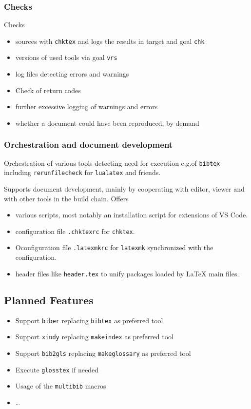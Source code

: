 \documentclass[a4paper,notumble,10pt,english]{leaflet}%
\begin{document}
\subsubsection{Checks}

Checks 
%
\begin{itemize}
  \item
  sources with \texttt{chktex} and logs the results in target and goal \texttt{chk} 
  \item
  versions of used tools via goal \texttt{vrs} 
  \item
  log files detecting errors and warnings 
  \item
  Check of return codes 
  \item
  further excessive logging of warnings and errors 
  \item
  whether a document could have been reproduced, by demand 
\end{itemize}


\subsubsection{Orchestration and document development}

Orchestration of various tools detecting need for execution 
e.g.\@ of \texttt{bibtex} including \texttt{rerunfilecheck} for \texttt{lualatex} and friends.

Supports document development, mainly by cooperating with editor, viewer and with other tools in the build chain. 
Offers 
%
\begin{itemize}
  \item various scripts, 
  most notably an installation script for extensions of VS Code.
  \item configuration file \texttt{.chktexrc} for \texttt{chktex}.
  \item Oconfiguration file \texttt{.latexmkrc} 
  for \texttt{latexmk} synchronized with the configuration.
  \item header files like \texttt{header.tex} 
  to unify packages loaded by \LaTeX{} main files. %
\end{itemize}

\subsection{Planned Features}

\begin{itemize}
  \item Support \texttt{biber} replacing \texttt{bibtex} as preferred tool
  \item Support \texttt{xindy} replacing \texttt{makeindex} as preferred tool
  \item Support \texttt{bib2gls} replacing \texttt{makeglossary} as preferred tool
  \item Execute \texttt{glosstex} if needed
  \item Usage of the \texttt{multibib} macros
  \item \dots
  \end{itemize}
\end{document}

